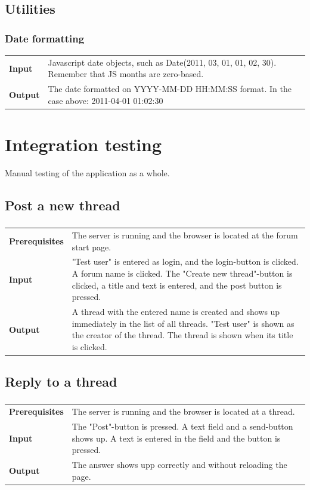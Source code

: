 \documentclass[a4paper, 12pt, titlepage]{article}
\newcommand{\ttestcase}[3]{
	\subsubsection{#1}
	\begin{tabular}{l p{11cm}}
	\bf{Input} & 
		#2\\
	\bf{Output} & 
		#3\\
	\end{tabular}
}
\newcommand{\ptestcase}[3]{
	\subsubsection{}
	\begin{tabular}{l p{10cm}}
	\bf{Prerequisites} & 
		#1\\
	\bf{Input} & 
		#2\\
	\bf{Output} & 
		#3\\
	\end{tabular}
}
\begin{document}
	\subsection{Utilities}

		\ttestcase{Date formatting}
		{
			Javascript date objects, such as Date(2011, 03, 01, 01, 02, 30). Remember that JS months are zero-based.
		}{
			The date formatted on YYYY-MM-DD HH:MM:SS format. In the case above:
			2011-04-01 01:02:30
		}

	\section{Integration testing}
	Manual testing of the application as a whole.

	\subsection{Post a new thread}
		\ptestcase{
			The server is running and the browser is located at the forum start page.
		}{
			"Test user" is entered as login, and the login-button is clicked.
			A forum name is clicked. The "Create new thread"-button is clicked, a title and text is entered, and the post button is pressed. 
		}{
			A thread with the entered name is created and shows up immediately in the list of all threads. "Test user" is shown as the creator of the thread. The thread is shown when its title is clicked.
		}


	\subsection{Reply to a thread}
		\ptestcase{
			The server is running and the browser is located at a thread.
		}{
			The "Post"-button is pressed. A text field and a send-button shows up. A text is entered in the field and the button is pressed.
		}{
			The answer shows upp correctly and without reloading the page.
		}
\end{document}
